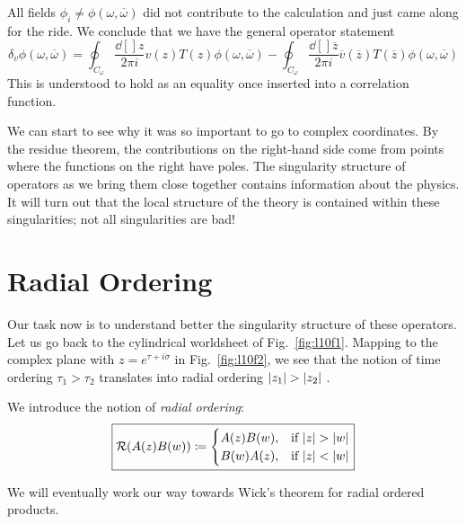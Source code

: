 All fields $\phi_i \neq \phi(\omega, \overline{\omega}{})$ did not contribute to the calculation and just came along for the ride.
We conclude that we have the general operator statement
\begin{equation}
  \boxed{\delta_v \phi(\omega, \overline{\omega}{}) = \oint_{C_{\omega}} \frac{\dd[]{z}}{2\pi i } v(z) T(z) \phi(\omega, \overline{\omega}{}) - \oint_{C_{\omega}} \frac{\dd[]{\overline{z}{}}}{2\pi i } \overline{v}{}(\overline{z}{}) T(\overline{z}{}) \phi(\omega, \overline{\omega}{})}
\end{equation}
This is understood to hold as an equality once inserted into a correlation function.

We can start to see why it was so important to go to complex coordinates.
By the residue theorem, the contributions on the right-hand side come from points where the functions on the right have poles.
The singularity structure of operators as we bring them close together contains information about the physics.
It will turn out that the local structure of the theory is contained within these singularities; not all singularities are bad!


\section{Radial Ordering}%
\label{sec:radial_ordering}

Our task now is to understand better the singularity structure of these operators.
Let us go back to the cylindrical worldsheet of Fig.~\ref{fig:l10f1}.
Mapping to the complex plane with $z = e^{\tau + i \sigma}$ in Fig.~\ref{fig:l10f2}, we see that the notion of time ordering $\tau_1 > \tau_2$  translates into radial ordering $\abs{z_1} > \abs{z_2}$ .
\begin{definition}
  We introduce the notion of \emph{radial ordering}:
  \begin{equation}
    \boxed{\mathcal{R}(A(z) B(w)) \coloneqq
    \begin{cases}
      A(z) B(w), & \text{if } \abs{z} > \abs{w} \\
      B(w) A(z), & \text{if } \abs{z} < \abs{w}
    \end{cases}}
  \end{equation}
\end{definition}
We will eventually work our way towards Wick's theorem for radial ordered products.
